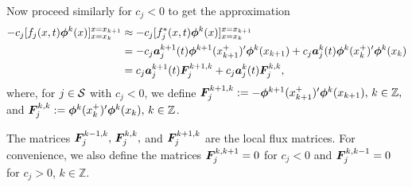 Now proceed similarly for \(c_j<0\) to get the approximation 
\begin{align*}
	-c_j[f_j(x,t)\boldsymbol\phi^k(x)]_{x=x_k}^{x=x_{k+1}} & \approx -c_j[f_j^*(x,t)\boldsymbol\phi^k(x)]_{x=x_k}^{x=x_{k+1}}
	\\& = -c_j\boldsymbol a_j^{k+1}(t)\boldsymbol \phi^{k+1}(x_{k+1}^+)'{}\boldsymbol\phi^k(x_{k+1}) + c_j\boldsymbol a_j^{k}(t)\boldsymbol \phi^{k}(x_{k}^+)'{}\boldsymbol\phi^k(x_{k})
	\\& = c_j\boldsymbol a_j^{k+1}(t)\boldsymbol F_j^{k+1,k}+c_j\boldsymbol a_j^{k}(t)\boldsymbol F_j^{k,k},
\end{align*}
where, for \(j\in \mathcal{S}\) with \(c_j<0\), we define \(\boldsymbol F_j^{k+1,k} := -\boldsymbol \phi^{k+1}(x_{k+1}^+)'{}\boldsymbol\phi^k(x_{k+1}),\,k\in\mathbb Z,\) and \(\boldsymbol F_j^{k,k} := \boldsymbol \phi^{k}(x_{k}^+)'{}\boldsymbol\phi^k(x_{k}),\,k\in\mathbb Z\).

The matrices \(\boldsymbol F_j^{k-1,k},\,\boldsymbol F_j^{k,k},\) and \(\boldsymbol F_j^{k+1,k}\) are the local flux matrices. For convenience, we also define the matrices \(\boldsymbol F_j^{k,k+1}=0\) for \(c_j<0\) and \(\boldsymbol F_j^{k,k-1}=0\) for \(c_j>0\), \(k\in\mathbb Z\).


